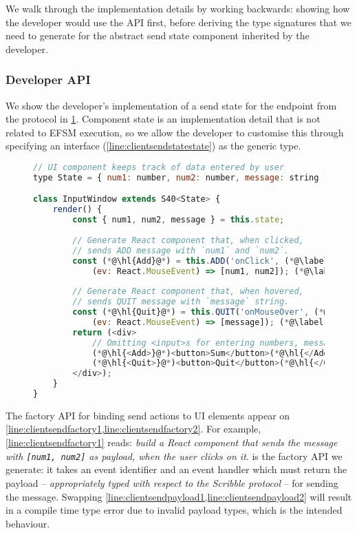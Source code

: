We walk through the implementation details by working backwards:
showing how the developer would use the API first,
before deriving the type signatures that we need to
generate for the abstract send state component inherited by the developer.

\subsubsection{Developer API}

We show the developer's implementation 
of a send state for the  endpoint
from the  protocol in \cref{lst:adderclientsenddev}.
Component state is an implementation detail 
that is not related to EFSM execution, so we allow
the developer to customise this through specifying an 
interface (\cref{line:clientsendstatestate}) as the generic type.

\begin{figure}[!h]
\begin{lstlisting}[language=javascript,tabsize=2]
// UI component keeps track of data entered by user
type State = { num1: number, num2: number, message: string }; (*@\label{line:clientsendstatestate}@*)

class InputWindow extends S40<State> {
	render() {
		const { num1, num2, message } = this.state;
	
		// Generate React component that, when clicked,
		// sends ADD message with `num1` and `num2`.
		const (*@\hl{Add}@*) = this.ADD('onClick', (*@\label{line:clientsendfactory1}@*)
			(ev: React.MouseEvent) => [num1, num2]); (*@\label{line:clientsendpayload1}@*)
			
		// Generate React component that, when hovered,
		// sends QUIT message with `message` string.
		const (*@\hl{Quit}@*) = this.QUIT('onMouseOver', (*@\label{line:clientsendfactory2}@*)
			(ev: React.MouseEvent) => [message]); (*@\label{line:clientsendpayload2}@*)
		return (<div>
			// Omitting <input>s for entering numbers, message
			(*@\hl{<Add>}@*)<button>Sum</button>(*@\hl{</Add>}@*)
			(*@\hl{<Quit>}@*)<button>Quit</button>(*@\hl{</Quit>}@*)
		</div>);
	}
}
\end{lstlisting}
\label{lst:adderclientsenddev}
\end{figure}

The factory API for binding send actions to UI elements appear on
\cref{line:clientsendfactory1,line:clientsendfactory2}.
For example, \cref{line:clientsendfactory1} reads: 
\textit{build a React component that sends the 
message with \texttt{[num1, num2]} as payload,
when the user clicks on it}.
 is the factory API we generate: it takes an event identifier
and an event handler which must return the payload 
-- \textit{appropriately typed with respect to the Scribble protocol} -- 
for sending the  message.
Swapping \cref{line:clientsendpayload1,line:clientsendpayload2}
will result in a compile time type error due to invalid 
payload types, which is the intended behaviour.

